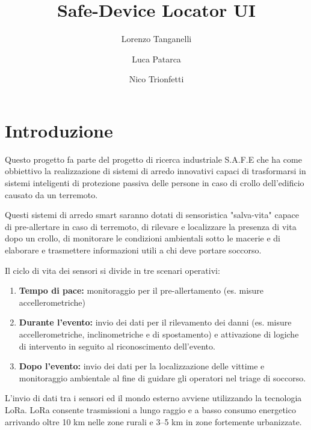\documentclass[a4paper]{article}
\begin{document}
\author{Lorenzo Tanganelli \and Luca Patarca \and Nico Trionfetti}
\title{Safe-Device Locator UI}
\maketitle

\newpage
\tableofcontents

\newpage

\section*{{Introduzione}}
Questo progetto fa parte del progetto di ricerca industriale S.A.F.E che ha come obbiettivo la realizzazione di sistemi di arredo innovativi capaci di trasformarsi in sistemi inteligenti di protezione passiva delle persone in caso di crollo dell'edificio causato da un terremoto.

Questi sistemi di arredo smart saranno dotati di sensoristica "salva-vita" capace di pre-allertare in caso di terremoto, di rilevare e localizzare la presenza di vita dopo un crollo, di monitorare le condizioni ambientali sotto le macerie e di elaborare e trasmettere informazioni utili a chi deve portare soccorso.

Il ciclo di vita dei sensori si divide in tre scenari operativi:
\begin{enumerate}[label=\roman{*}., ref=(\roman{*})]
    \item \textbf{Tempo di pace:} monitoraggio per il pre-allertamento (es. misure accellerometriche)
    \item \textbf{Durante l'evento:} invio dei dati per il rilevamento dei danni (es. misure accellerometriche, inclinometriche e di spostamento) e attivazione di logiche di intervento in seguito al riconoscimento dell'evento.
    \item \textbf{Dopo l'evento:} invio dei dati per la localizzazione delle vittime e monitoraggio ambientale al fine di guidare gli operatori nel triage di soccorso.
    \end{enumerate}

L'invio di dati tra i sensori ed il mondo esterno avviene utilizzando la tecnologia LoRa.\newline
LoRa consente trasmissioni a lungo raggio e a basso consumo energetico arrivando oltre 10 km nelle zone rurali e 3–5 km in zone fortemente urbanizzate.
\end{document}
